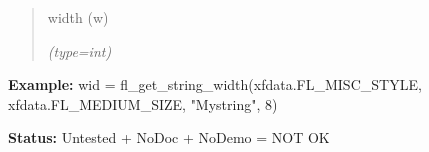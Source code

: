 \begin{boxedminipage}{\funcwidth}
      \begin{quote}
      width (w)

      {\it (type=int)}

      \end{quote}

\textbf{Example:} wid = fl\_get\_string\_width(xfdata.FL\_MISC\_STYLE, 
xfdata.FL\_MEDIUM\_SIZE, "Mystring", 8)



\textbf{Status:} Untested + NoDoc + NoDemo = NOT OK



    \end{boxedminipage}

    \label{xformslib:flbasic:fl_get_string_dimension}

    \vspace{0.5ex}

